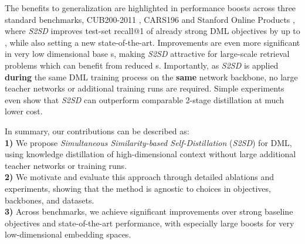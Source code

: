 \documentclass{article} \usepackage{arxiv_style,times}
\begin{document}
The benefits to generalization are highlighted in performance boosts across three standard benchmarks, CUB200-2011 \citep{cub200-2011}, CARS196 \citep{cars196} and Stanford Online Products \citep{lifted}, where \textit{S2SD} improves test-set recall@1 of already strong DML objectives by up to , while also setting a new state-of-the-art. Improvements are even more significant in very low dimensional base s, making \textit{S2SD} attractive for large-scale retrieval problems which can benefit from reduced s.
Importantly, as \textit{S2SD} is applied \textbf{during} the same DML training process on the \textbf{same} network backbone, no large teacher networks or additional training runs are required. Simple experiments even show that \textit{S2SD} can outperform comparable 2-stage distillation at much lower cost.

In summary, our contributions can be described as:\\
\textbf{1)} We propose \textit{Simultaneous Similarity-based Self-Distillation} (\textit{S2SD}) for DML, using knowledge distillation of high-dimensional context without large additional teacher networks or training runs.\\
\textbf{2)} We motivate and evaluate this approach through detailed ablations and experiments, showing that the method is agnostic to choices in objectives, backbones, and datasets.\\
\textbf{3)} Across benchmarks, we achieve significant improvements over strong baseline objectives and state-of-the-art performance, with especially large boosts for very low-dimensional embedding spaces.
\end{document}
